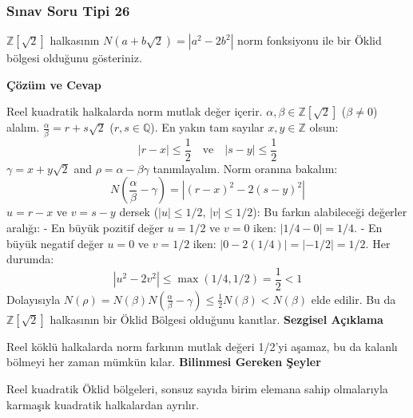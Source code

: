 \documentclass[11pt, a4paper]{article}
\newenvironment{cozum}{
    \vspace{0.5cm}
    \noindent\textcolor{green!60!black}{\faCheckCircle\enspace \textbf{\Large Çözüm ve Cevap}}\par\vspace{0.2cm}
}{}
\newenvironment{sezgisel}{
    \vspace{0.5cm}
    \noindent\textcolor{orange!80!black}{\faLightbulb\enspace \textbf{\Large Sezgisel Açıklama}}\par\vspace{0.2cm}
    \itshape
}{}
\newenvironment{bilgi}{
    \vspace{0.5cm}
    \noindent\textcolor{red!70!black}{\faExclamationTriangle\enspace \textbf{\Large Bilinmesi Gereken Şeyler}}\par\vspace{0.2cm}
}{}
\begin{document}
\subsubsection{Sınav Soru Tipi 26}
\begin{sinavbox}
$\mathbb{Z}[\sqrt{2}]$ halkasının $N(a+b\sqrt{2}) = |a^2-2b^2|$ norm fonksiyonu ile bir Öklid bölgesi olduğunu gösteriniz.
\end{sinavbox}
\begin{cozum}
Reel kuadratik halkalarda norm mutlak değer içerir.
$\alpha, \beta \in \mathbb{Z}[\sqrt{2}]$ ($\beta \neq 0$) alalım. $\frac{\alpha}{\beta} = r + s\sqrt{2}$ ($r, s \in \mathbb{Q}$).
En yakın tam sayılar $x, y \in \mathbb{Z}$ olsun:
\[ |r-x| \le \frac{1}{2} \quad \text{ve} \quad |s-y| \le \frac{1}{2} \]
$\gamma = x+y\sqrt{2}$ and $\rho = \alpha - \beta\gamma$ tanımlayalım.
Norm oranına bakalım:
\[ N\left( \frac{\alpha}{\beta} - \gamma \right) = |(r-x)^2 - 2(s-y)^2| \]
$u = r-x$ ve $v = s-y$ dersek ($|u| \le 1/2$, $|v| \le 1/2$):
Bu farkın alabileceği değerler aralığı:
- En büyük pozitif değer $u = 1/2$ ve $v = 0$ iken: $|1/4 - 0| = 1/4$.
- En büyük negatif değer $u = 0$ ve $v = 1/2$ iken: $|0 - 2(1/4)| = |-1/2| = 1/2$.
Her durumda:
\[ |u^2 - 2v^2| \le \max(1/4, 1/2) = \frac{1}{2} < 1 \]
Dolayısıyla $N(\rho) = N(\beta) N(\frac{\alpha}{\beta}-\gamma) \le \frac{1}{2} N(\beta) < N(\beta)$ elde edilir.
Bu da $\mathbb{Z}[\sqrt{2}]$ halkasının bir Öklid Bölgesi olduğunu kanıtlar.
\end{cozum}
\begin{sezgisel}
Reel köklü halkalarda norm farkının mutlak değeri 1/2'yi aşamaz, bu da kalanlı bölmeyi her zaman mümkün kılar.
\end{sezgisel}
\begin{bilgi}
Reel kuadratik Öklid bölgeleri, sonsuz sayıda birim elemana sahip olmalarıyla karmaşık kuadratik halkalardan ayrılır.
\end{bilgi}

\newpage
\end{document}
